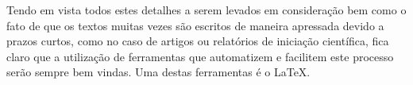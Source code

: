 Tendo em vista todos estes detalhes a serem levados em consideração bem como o fato de que os textos muitas vezes são escritos de maneira apressada devido a prazos curtos, como no caso de artigos ou relatórios de iniciação científica, fica claro que a utilização de ferramentas que automatizem e facilitem este processo serão sempre bem vindas. Uma destas ferramentas é o \LaTeX.



